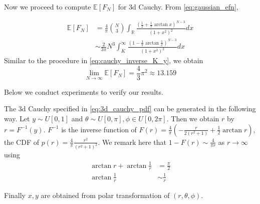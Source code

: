 \documentclass{article}
\def\E{\mathbb{E}}
\def\R{\mathbb{R}}
\begin{document}
Now we proceed to compute $\E[F_N]$ for 3d Cauchy.
From \eqref{eq:gaussian_efn},

\begin{align}
\E[F_N]& = \frac{4}{\pi} \binom{N}{3}
\int_{\R} 
\frac{(\frac{1}{2} + \frac{1}{\pi}\arctan x)^{N-3}
}{(1+x^2)^2} dx \label{eq:d_3_cauchy_f_n}\\
& \sim \frac{2}{3\pi} N^3 \int_{K}^{\infty}
\frac{(1-\frac{1}{\pi}\arctan\frac{1}{x})^{N-3}
}{(1+x^2)^2} dx
\end{align}
Similar to the procedure in \eqref{eq:cauchy_inverse_K_y},
we obtain
\begin{equation}
    \lim_{N\to \infty} \E[F_N]
    = \frac{4}{3} \pi^2 \approx 13.159
\end{equation}

Below we conduct experiments to verify our results.


The 3d Cauchy specified in
\eqref{eq:3d_cauchy_pdf} can be generated in the following way.
Let $y \sim U[0,1]$ and $\theta \sim
U[0, \pi], \phi \in U[0, 2\pi]$.
Then we obtain $r$
by $r=F^{-1}(y)$.
$F^{-1}$ is the inverse function
of $F(r)=\frac{4}{\pi}(
-\frac{r}{2(r^2+1)}
+\frac{1}{2}\arctan r
)$, the CDF of
$p(r)= \frac{4}{\pi}\frac{r^2}{(r^2+1)^{2}}$.
We remark here that $1-F(r) \sim \frac{4}{\pi r}$
as $r\to \infty$
using
\begin{align*}
    \arctan r + \arctan \frac{1}{r} & = \frac{\pi}{2} \\
    \arctan \frac{1}{r} & \sim \frac{1}{r} 
\end{align*}

Finally $x,y$ are obtained from polar transformation
of $(r,\theta, \phi)$.
\end{document}
